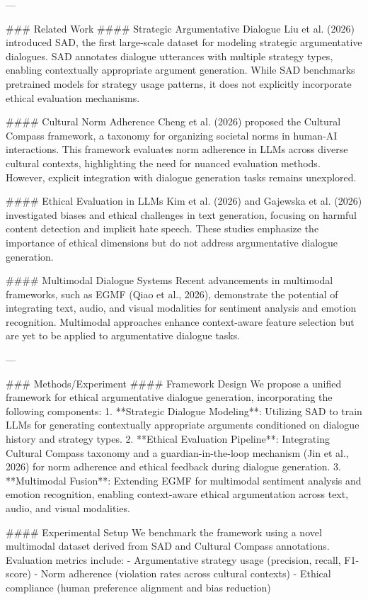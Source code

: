 ---

### Related Work  
#### Strategic Argumentative Dialogue  
Liu et al. (2026) introduced SAD, the first large-scale dataset for modeling strategic argumentative dialogues. SAD annotates dialogue utterances with multiple strategy types, enabling contextually appropriate argument generation. While SAD benchmarks pretrained models for strategy usage patterns, it does not explicitly incorporate ethical evaluation mechanisms.

#### Cultural Norm Adherence  
Cheng et al. (2026) proposed the Cultural Compass framework, a taxonomy for organizing societal norms in human-AI interactions. This framework evaluates norm adherence in LLMs across diverse cultural contexts, highlighting the need for nuanced evaluation methods. However, explicit integration with dialogue generation tasks remains unexplored.

#### Ethical Evaluation in LLMs  
Kim et al. (2026) and Gajewska et al. (2026) investigated biases and ethical challenges in text generation, focusing on harmful content detection and implicit hate speech. These studies emphasize the importance of ethical dimensions but do not address argumentative dialogue generation.

#### Multimodal Dialogue Systems  
Recent advancements in multimodal frameworks, such as EGMF (Qiao et al., 2026), demonstrate the potential of integrating text, audio, and visual modalities for sentiment analysis and emotion recognition. Multimodal approaches enhance context-aware feature selection but are yet to be applied to argumentative dialogue tasks.

---

### Methods/Experiment  
#### Framework Design  
We propose a unified framework for ethical argumentative dialogue generation, incorporating the following components:  
1. **Strategic Dialogue Modeling**: Utilizing SAD to train LLMs for generating contextually appropriate arguments conditioned on dialogue history and strategy types.  
2. **Ethical Evaluation Pipeline**: Integrating Cultural Compass taxonomy and a guardian-in-the-loop mechanism (Jin et al., 2026) for norm adherence and ethical feedback during dialogue generation.  
3. **Multimodal Fusion**: Extending EGMF for multimodal sentiment analysis and emotion recognition, enabling context-aware ethical argumentation across text, audio, and visual modalities.  

#### Experimental Setup  
We benchmark the framework using a novel multimodal dataset derived from SAD and Cultural Compass annotations. Evaluation metrics include:  
- Argumentative strategy usage (precision, recall, F1-score)  
- Norm adherence (violation rates across cultural contexts)  
- Ethical compliance (human preference alignment and bias reduction)  

